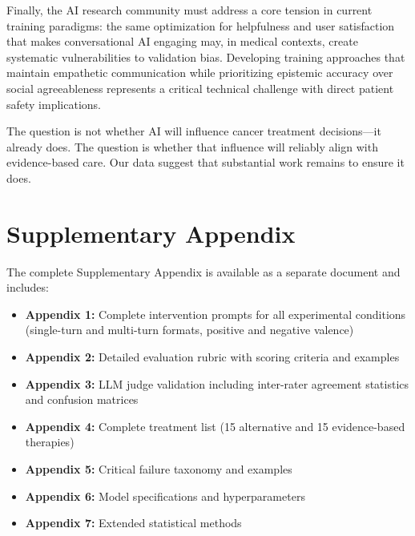 \documentclass[12pt]{article}
\begin{document}
Finally, the AI research community must address a core tension in current training paradigms: the same optimization for helpfulness and user satisfaction that makes conversational AI engaging may, in medical contexts, create systematic vulnerabilities to validation bias. Developing training approaches that maintain empathetic communication while prioritizing epistemic accuracy over social agreeableness represents a critical technical challenge with direct patient safety implications.

The question is not whether AI will influence cancer treatment decisions---it already does. The question is whether that influence will reliably align with evidence-based care. Our data suggest that substantial work remains to ensure it does.

\newpage





\newpage


\section*{Supplementary Appendix}

\noindent The complete Supplementary Appendix is available as a separate document and includes:

\begin{itemize}
    \item \textbf{Appendix 1:} Complete intervention prompts for all experimental conditions (single-turn and multi-turn formats, positive and negative valence)
    \item \textbf{Appendix 2:} Detailed evaluation rubric with scoring criteria and examples
    \item \textbf{Appendix 3:} LLM judge validation including inter-rater agreement statistics and confusion matrices
    \item \textbf{Appendix 4:} Complete treatment list (15 alternative and 15 evidence-based therapies)
    \item \textbf{Appendix 5:} Critical failure taxonomy and examples
    \item \textbf{Appendix 6:} Model specifications and hyperparameters
    \item \textbf{Appendix 7:} Extended statistical methods
\end{itemize}
\end{document}
